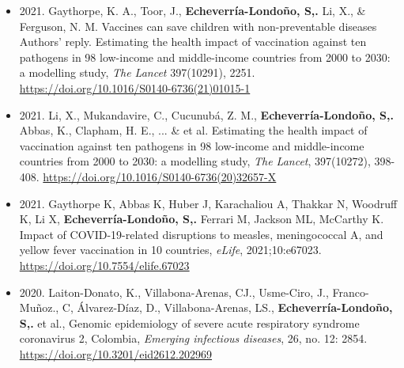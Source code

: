 \documentclass[10pt, a4paper]{article}
\begin{document}
\begin{minipage}[t]{0.9\textwidth}
\begin{itemize}
\item 2021. Gaythorpe, K. A., Toor, J., \textbf{Echeverr\'ia-Londo\~no, S,.}  Li, X., \& Ferguson, N. M. Vaccines can save children with non-preventable diseases Authors' reply.  Estimating the health impact of vaccination against ten pathogens in 98 low-income and middle-income countries from 2000 to 2030: a modelling study, \textit{The Lancet} 397(10291), 2251. \url{https://doi.org/10.1016/S0140-6736(21)01015-1}

\item2021. Li, X., Mukandavire, C., Cucunub\'a, Z. M., \textbf{Echeverr\'ia-Londo\~no, S,.} Abbas, K., Clapham, H. E., ... \& et al.  Estimating the health impact of vaccination against ten pathogens in 98 low-income and middle-income countries from 2000 to 2030: a modelling study, \textit{The Lancet},  397(10272), 398-408. \url{https://doi.org/10.1016/S0140-6736(20)32657-X}

\item 2021. Gaythorpe K, Abbas K, Huber J, Karachaliou A, Thakkar N, Woodruff K, Li X, \textbf{Echeverr\'ia-Londo\~no, S,.}  Ferrari M, Jackson ML, McCarthy K. Impact of COVID-19-related disruptions to measles, meningococcal A, and yellow fever vaccination in 10 countries, \textit{eLife}, 2021;10:e67023. \url{https://doi.org/10.7554/elife.67023}

\item 2020. Laiton-Donato, K., Villabona-Arenas, CJ., Usme-Ciro, J.,  Franco-Mu\~noz., C,  \'Alvarez-D\'iaz, D., Villabona-Arenas, LS., \textbf{Echeverr\'ia-Londo\~no, S,.} et al.,  Genomic epidemiology of severe acute respiratory syndrome coronavirus 2, Colombia, \textit{Emerging infectious diseases},  26, no. 12: 2854. \url{https://doi.org/10.3201/eid2612.202969}

\end{itemize}

\end{minipage}
\end{document}

